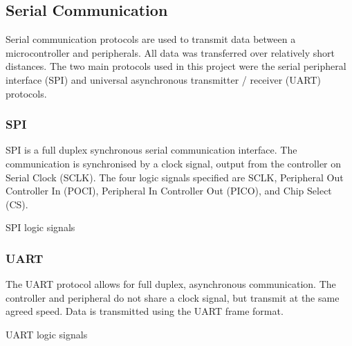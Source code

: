 \documentclass[12pt,a4paper]{report}
\makeatletter
\newenvironment{figurehere}
  {\def\@captype{figure}}
  {}
\makeatother
\begin{document}
\subsection{Serial Communication}
Serial communication protocols are used to transmit data between a microcontroller and peripherals. All data was transferred over relatively short distances. The two main protocols used in this project were the serial peripheral interface (SPI) and universal asynchronous transmitter / receiver (UART) protocols. 
\subsubsection{SPI}
SPI is a full duplex synchronous serial communication interface. The communication is synchronised by a clock signal, output from the controller on Serial Clock (SCLK). The four logic signals specified are SCLK, Peripheral Out Controller In (POCI), Peripheral In Controller Out (PICO), and Chip Select (CS). 
\begin{figurehere}
\begin{center}
\end{center}
\caption{SPI logic signals}
\end{figurehere}
\subsubsection{UART}
The UART protocol allows for full duplex, asynchronous communication. The controller and peripheral do not share a clock signal, but transmit at the same agreed speed. Data is transmitted using the UART frame format. 
\begin{figurehere}
\begin{center}
\end{center}
\caption{UART logic signals}
\end{figurehere}
\end{document}
